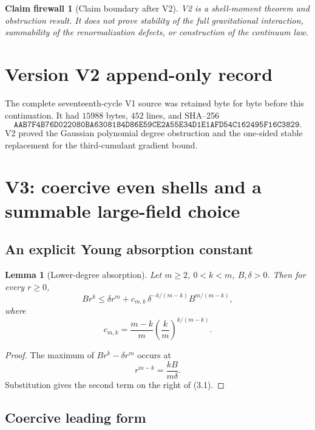 \documentclass[11pt]{article}
\newtheorem{lemma}[theorem]{Lemma}
\newtheorem{firewall}[theorem]{Claim firewall}
\theoremstyle{remark}
\begin{document}
\begin{firewall}[Claim boundary after V2]
\label{fire:v17v2}
V2 is a shell-moment theorem and obstruction result.  It does not
prove stability of the full gravitational interaction, summability
of the renormalization defects, or construction of the continuum
law.
\end{firewall}

\section*{Version V2 append-only record}
The complete seventeenth-cycle V1 source was retained byte for byte
before this continuation.  It had \(15988\) bytes, \(452\) lines,
and SHA--256
\[
 \texttt{AAB7F4B76D022080BA6308184D86E59CE2A55E34D1E1AFD54C162495F16C3829}.
\]
V2 proved the Gaussian polynomial degree obstruction and the
one-sided stable replacement for the third-cumulant gradient bound.


\section{V3: coercive even shells and a summable large-field choice}
\label{sec:v17v3}

\subsection{An explicit Young absorption constant}

\begin{lemma}[Lower-degree absorption]
\label{lem:v17v3-young}
Let \(m\geq2\), \(0<k<m\), \(B,\delta>0\).  Then for every
\(r\geq0\),
\[
 Br^k
 \leq
 \delta r^m+
 c_{m,k}\,
 \delta^{-k/(m-k)}
 B^{m/(m-k)},                                      \tag{3.1}
\]
where
\[
 c_{m,k}
 =
 \frac{m-k}{m}
 \left(\frac{k}{m}\right)^{k/(m-k)}.                \tag{3.2}
\]
\end{lemma}

\begin{proof}
The maximum of \(Br^k-\delta r^m\) occurs at
\[
 r^{m-k}=\frac{kB}{m\delta}.
\]
Substitution gives the second term on the right of (3.1).
\end{proof}

\subsection{Coercive leading form}
\end{document}
